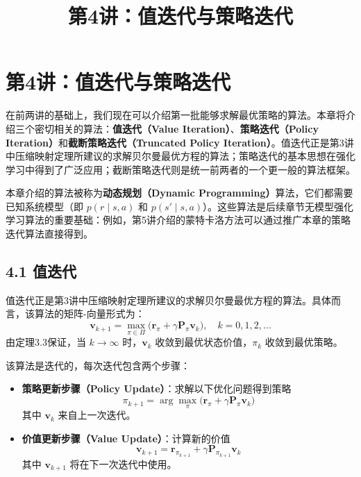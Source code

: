 \documentclass[UTF8]{article}
\title{第4讲：值迭代与策略迭代}
\author{}
\date{}
\begin{document}
\maketitle
\thispagestyle{empty}

\section*{第4讲：值迭代与策略迭代}

在前两讲的基础上，我们现在可以介绍第一批能够求解最优策略的算法。本章将介绍三个密切相关的算法：\textbf{值迭代（Value Iteration）}、\textbf{策略迭代（Policy Iteration）}和\textbf{截断策略迭代（Truncated Policy Iteration）}。值迭代正是第3讲中压缩映射定理所建议的求解贝尔曼最优方程的算法；策略迭代的基本思想在强化学习中得到了广泛应用；截断策略迭代则是统一前两者的一个更一般的算法框架。

本章介绍的算法被称为\textbf{动态规划（Dynamic Programming）}算法，它们都需要已知系统模型（即 $p(r \mid s,a)$ 和 $p(s' \mid s,a)$）。这些算法是后续章节无模型强化学习算法的重要基础：例如，第5讲介绍的蒙特卡洛方法可以通过推广本章的策略迭代算法直接得到。

\subsection*{4.1 值迭代}

值迭代正是第3讲中压缩映射定理所建议的求解贝尔曼最优方程的算法。具体而言，该算法的矩阵-向量形式为：
\[
\boldsymbol{v}_{k+1} = \max_{\pi \in \Pi} \bigl( \boldsymbol{r}_\pi + \gamma \boldsymbol{P}_\pi \boldsymbol{v}_k \bigr), \quad k = 0,1,2,\dots
\]
由定理3.3保证，当 $k \to \infty$ 时，$\boldsymbol{v}_k$ 收敛到最优状态价值，$\pi_k$ 收敛到最优策略。

该算法是迭代的，每次迭代包含两个步骤：
\begin{itemize}
    \item \textbf{策略更新步骤（Policy Update）}：求解以下优化问题得到策略
    \[
    \pi_{k+1} = \arg\max_{\pi} \bigl( \boldsymbol{r}_\pi + \gamma \boldsymbol{P}_\pi \boldsymbol{v}_k \bigr)
    \]
    其中 $\boldsymbol{v}_k$ 来自上一次迭代。

    \item \textbf{价值更新步骤（Value Update）}：计算新的价值
    \begin{equation}
    \boldsymbol{v}_{k+1} = \boldsymbol{r}_{\pi_{k+1}} + \gamma \boldsymbol{P}_{\pi_{k+1}} \boldsymbol{v}_k
    \label{eq:vi_value_update}
    \end{equation}
    其中 $\boldsymbol{v}_{k+1}$ 将在下一次迭代中使用。
\end{itemize}
\end{document}
